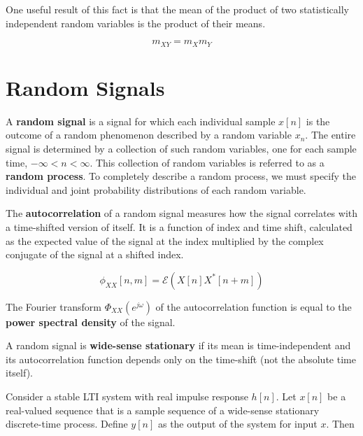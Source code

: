 One useful result of this fact is that the mean of the product of two statistically independent random variables is the product of their means.

\begin{equation}
	m_{XY} = m_Xm_Y
\end{equation}

\section{Random Signals}

A \textbf{random signal} is a signal for which each individual sample $x[n]$ is the outcome of a random phenomenon described by a random variable $x_n$. The entire signal is determined by a collection of such random variables, one for each sample time, $-\infty < n < \infty$. This collection of random variables is referred to as a \textbf{random process}. To completely describe a random process, we must specify the individual and joint probability distributions of each random variable.

\vspace{0.5cm}

The \textbf{autocorrelation} of a random signal measures how the signal correlates with a time-shifted version of itself. It is a function of index and time shift, calculated as the expected value of the signal at the index multiplied by the complex conjugate of the signal at a shifted index.

\begin{equation}
	\phi_{XX}[n, m] = \mathcal{E}(X[n]X^*[n + m])
\end{equation}

The Fourier transform $\Phi_{XX}(e^{j\omega})$ of the autocorrelation function is equal to the \textbf{power spectral density} of the signal.

\vspace{0.5cm}

A random signal is \textbf{wide-sense stationary} if its mean is time-independent and \underline{}its autocorrelation function depends only on the time-shift (not the absolute time itself).

\vspace{0.5cm}

Consider a stable LTI system with real impulse response $h[n]$. Let $x[n]$ be a real-valued sequence that is a sample sequence of a wide-sense stationary discrete-time process. Define $y[n]$ as the output of the system for input $x$. Then

